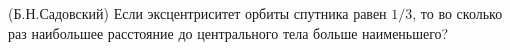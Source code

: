 (Б.Н.Садовский)
Если эксцентриситет орбиты спутника равен $1/3$, то во сколько раз наибольшее
расстояние до центрального тела больше наименьшего?
